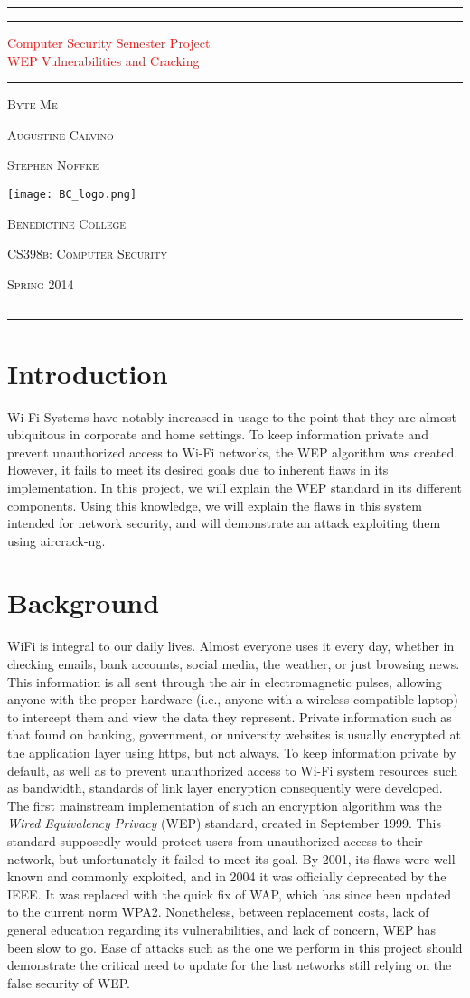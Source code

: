 \documentclass[12pt]{article}
\newcommand*{\titleAT}{\begingroup %
\newlength{\drop} %
\drop=0.1\textheight %

\rule{\textwidth}{1pt}\par %
\vspace{2pt}\vspace{-\baselineskip} %
\rule{\textwidth}{0.4pt}\par %

\vspace{\drop} %
\centering %
\textcolor{Red}{ %
{\Huge Computer Security Semester Project}\\[0.5\baselineskip] %
{\Huge WEP Vulnerabilities and Cracking}} %

\vspace{0.25\drop} %
\rule{0.3\textwidth}{0.4pt}\par %
\vspace{\drop} %

{\Large \textsc{Byte Me}}\par 
\vspace{12pt}
{\large \textsc{Augustine Calvino}}\par 
\vspace{8pt}
{\large \textsc{Stephen Noffke}}\par 
\vspace{30pt}

\vfill %

\texttt{[image: BC\_logo.png]} \par
\vspace{5pt}
{\Large \textsc{Benedictine College}}\par
{\large \textsc{CS398b: Computer Security}}\par
{\large \textsc{Spring 2014}}\par

\vspace*{\drop} %

\rule{\textwidth}{0.4pt}\par %
\vspace{2pt}\vspace{-\baselineskip} %
\rule{\textwidth}{1pt}\par %

\endgroup}
\begin{document}
\thispagestyle{empty}  %
\titleAT 
\pagebreak

\setcounter{page}{1}  	%

\section{Introduction}   
\label{section:intro}
Wi-Fi Systems have notably increased in usage to the point that they are almost ubiquitous in corporate and home settings.  To keep information private and prevent unauthorized access to Wi-Fi networks, the WEP algorithm was created.  However, it fails to meet its desired goals due to inherent flaws in its implementation.  In this project, we will explain the WEP standard in its different components.  Using this knowledge, we will explain the flaws in this system intended for network security, and will demonstrate an attack exploiting them using aircrack-ng.

\section{Background}
\label{sec:bckgd}
WiFi is integral to our daily lives.  Almost everyone uses it every day, whether in checking emails, bank accounts, social media, the weather, or just browsing news.  This information is all sent through the air in electromagnetic pulses, allowing anyone with the proper hardware (i.e., anyone with a wireless compatible laptop) to intercept them and view the data they represent.  Private information such as that found on banking, government, or university websites is usually encrypted at the application layer using https, but not always.  To keep information private by default, as well as to prevent unauthorized access to Wi-Fi system resources such as bandwidth, standards of link layer encryption consequently were developed.  The first mainstream implementation of such an encryption algorithm was the \textit{Wired Equivalency Privacy} (WEP) standard, created in September 1999.  This standard supposedly would protect users from unauthorized access to their network, but unfortunately it failed to meet its goal.  By 2001, its flaws were well known and commonly exploited, and in 2004 it was officially deprecated by the IEEE.  It was replaced with the quick fix of WAP, which has since been updated to the current norm WPA2.  Nonetheless, between replacement costs, lack of general education regarding its vulnerabilities, and lack of concern, WEP has been slow to go.  Ease of attacks such as the one we perform in this project should demonstrate the critical need to update for the last networks still relying on the false security of WEP.
\end{document}
